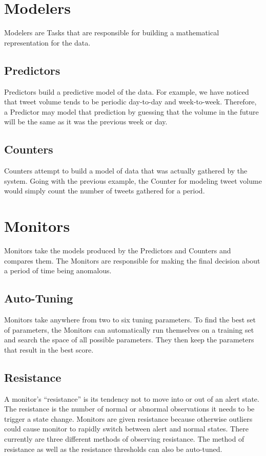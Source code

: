 \documentclass[12pt]{ucthesis}
\begin{document}
\section{Modelers}
\label{arch-modelers}
Modelers are Tasks that are responsible for building a mathematical representation for the data.

\subsection{Predictors}
\label{arch-predictors}
Predictors build a predictive model of the data. For example, we have noticed that tweet volume tends to be
periodic day-to-day and week-to-week. Therefore, a Predictor may model that prediction by guessing that the volume
in the future will be the same as it was the previous week or day.

\subsection{Counters}
\label{arch-counters}
Counters attempt to build a model of data that was actually gathered by the system. Going with the previous example,
the Counter for modeling tweet volume would simply count the number of tweets gathered for a period.

\section{Monitors}
\label{arch-monitors}
Monitors take the models produced by the Predictors and Counters and compares them. The Monitors are responsible for
making the final decision about a period of time being anomalous.

\subsection{Auto-Tuning}
\label{arch-autotuning}
Monitors take anywhere from two to six tuning parameters. To find the best set of parameters, the Monitors can
automatically run themselves on a training set and search the space of all possible parameters. They then keep the
parameters that result in the best score.

\subsection{Resistance}
\label{arch-resistance}
A monitor's ``resistance'' is its tendency not to move into or out of an alert state.
The resistance is the number of normal or abnormal observations it needs to be
trigger a state change. Monitors are given resistance because otherwise outliers could cause
monitor to rapidly switch between alert and normal states.
There currently are three different methods of observing resistance.
The method of resistance as well as the resistance thresholds can also be auto-tuned.
\end{document}
